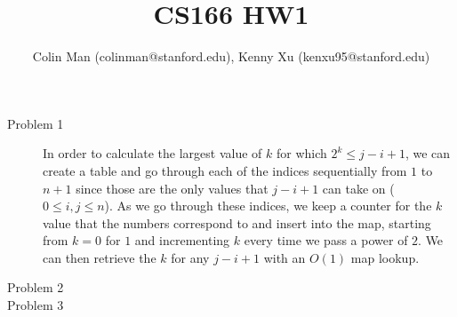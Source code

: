 \documentclass[11pt,oneside,a4paper]{article}
\begin{document}
\title{CS166 HW1}
\author{Colin Man (colinman@stanford.edu), Kenny Xu (kenxu95@stanford.edu)}

\maketitle

\begin{description}

\item[Problem 1]\noindent
In order to calculate the largest value of $k$ for which $2^k \leq j - i + 1$, we can create a table and go through each of the indices sequentially from $1$ to $n + 1$ since those are the only values that $j-i+1$ can take on ($0\leq i,j \leq n$). As we go through these indices, we keep a counter for the $k$ value that the numbers correspond to and insert into the map, starting from $k=0$ for $1$ and incrementing $k$ every time we pass a power of $2$. We can then retrieve the $k$ for any $j-i+1$ with an $O(1)$ map lookup.

\newpage

\item[Problem 2]\noindent

\newpage

\item[Problem 3]\noindent 


\end{description}
\end{document}
